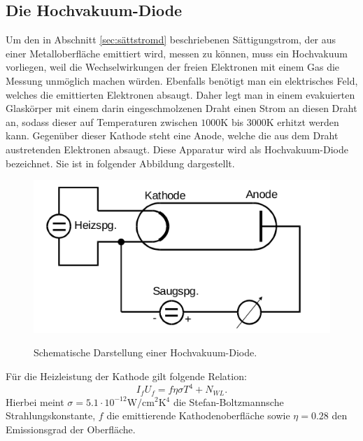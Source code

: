 \subsection{Die Hochvakuum-Diode}
\label{sec:hochvak}
Um den in Abschnitt \ref{sec:sättstromd} beschriebenen Sättigungstrom, der aus
einer Metalloberfläche emittiert wird, messen zu können, muss ein Hochvakuum
vorliegen, weil die Wechselwirkungen der freien Elektronen mit einem Gas die
Messung unmöglich machen würden. Ebenfalls benötigt man ein elektrisches Feld,
welches die emittierten Elektronen absaugt. Daher legt man in einem evakuierten
Glaskörper mit einem darin eingeschmolzenen Draht einen Strom an diesen Draht an,
sodass dieser auf Temperaturen zwischen $1000 \si{\kelvin}$ bis $3000 \si{\kelvin}$
erhitzt werden kann. Gegenüber dieser Kathode steht eine Anode, welche die aus
dem Draht austretenden Elektronen absaugt. Diese Apparatur wird als
Hochvakuum-Diode bezeichnet. Sie ist in folgender Abbildung dargestellt.
\begin{figure}[H]
  \centering
  \includegraphics[scale=0.5]{content/hochvakuumdiode.png}
  \label{fig:hochvakuumd}
  \caption{Schematische Darstellung einer Hochvakuum-Diode.}
\end{figure}
\noindent
Für die Heizleistung der Kathode gilt folgende Relation:
\begin{equation}
  I_f U_f = f \eta \sigma T^4 + N_{WL}.
  \label{eqn:heizleistung}
\end{equation}
Hierbei meint $\sigma = 5.1 \cdot 10^{-12}\si{\watt\per\centi\meter\squared\kelvin^4}$
die Stefan-Boltzmannsche Strahlungskonstante, $f$ die emittierende Kathodenoberfläche
sowie $\eta = 0.28$ den Emissionsgrad der Oberfläche.

